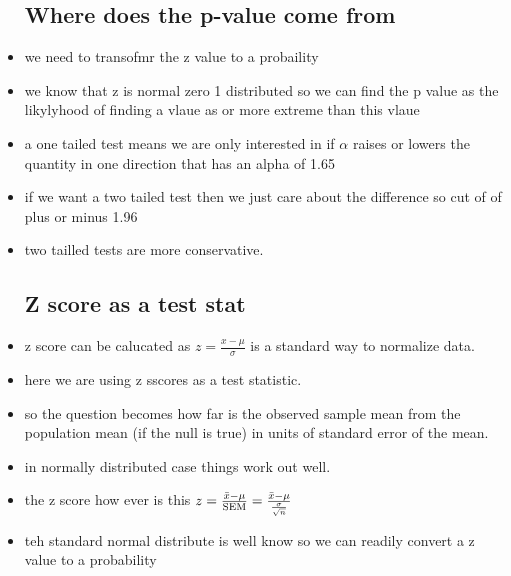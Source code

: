 \documentclass{article}
\begin{document}
\begin{itemize}
\subsection{ Where does the p-value come from }
\item we need to transofmr the z value to a probaility
\item we know that z is normal zero 1 distributed so we can find the p value as the likylyhood of finding a vlaue as or more extreme than this vlaue 
\item a one tailed test means we are only interested in if $\alpha$ raises or lowers the quantity in one direction that has an alpha of 1.65
\item if we want a two tailed test then we just care about the difference so cut of of plus or minus 1.96
\item two tailled tests are more conservative. 
\subsection{Z score as a test stat}
\item z score can be calucated as $z=\frac{x-\mu}{\sigma}$ is a standard way to normalize data. 
\item here we are using z sscores as a test statistic. 
\item so the question becomes how far is the observed sample mean from the population mean (if the null is true) in units of standard error of the mean. 
\item in normally distributed case things work out well.
\item the z score how ever is this $z=\frac{\Bar{x}-\mu}{\text{SEM}}=\frac{\Bar{x}-\mu}{\frac{\sigma}{\sqrt{n}}}$
\item teh standard normal distribute is well know so we can readily convert a z value to a probability 

\end{itemize}
\end{document}
